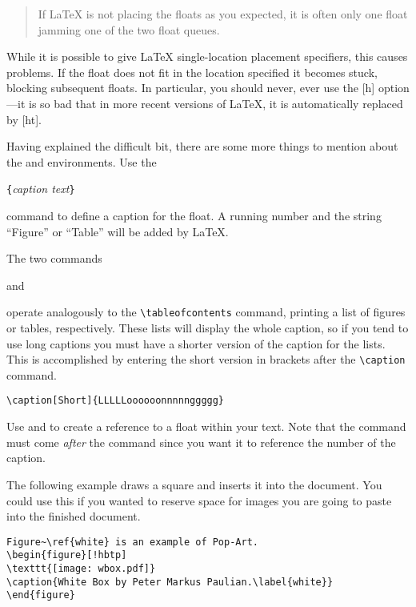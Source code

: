 \begin{quote}
If \LaTeX{} is not placing the floats as you expected,
it is often only one float jamming one of the two float queues.
\end{quote}

While it is possible to give \LaTeX{}  single-location placement
specifiers, this causes problems.  If the float does not fit in the
location specified it becomes stuck, blocking subsequent floats.
In particular, you should never, ever use the [h] option---it is so bad
that in more recent versions of \LaTeX, it is automatically replaced by
[ht].

\bigskip
\noindent Having explained the difficult bit, there are some more things to
mention about the  and  environments.
Use the

\begin{lscommand}
\verb|{|\emph{caption text}\verb|}|
\end{lscommand}

\noindent command to define a caption for the float. A running number and
the string ``Figure'' or ``Table'' will be added by \LaTeX.

The two commands

\begin{lscommand}
 and 
\end{lscommand}

\noindent operate analogously to the \verb|\tableofcontents| command,
printing a list of figures or tables, respectively.  These lists will
display the whole caption, so if you tend to use long captions
you must have a shorter version of the caption for the lists.
This is accomplished by entering the short version in brackets after
the \verb|\caption| command.
\begin{code}
\verb|\caption[Short]{LLLLLoooooonnnnnggggg}|
\end{code}

Use  and  to create a reference to a float within
your text. Note that the  command must come \emph{after} the
 command since you want it to reference the number of the
caption.

The following example draws a square and inserts it into the
document. You could use this if you wanted to reserve space for images
you are going to paste into the finished document.

\begin{code}
\begin{verbatim}
Figure~\ref{white} is an example of Pop-Art.
\begin{figure}[!hbtp]
\texttt{[image: wbox.pdf]}
\caption{White Box by Peter Markus Paulian.\label{white}}
\end{figure}
\end{verbatim}
\end{code}

